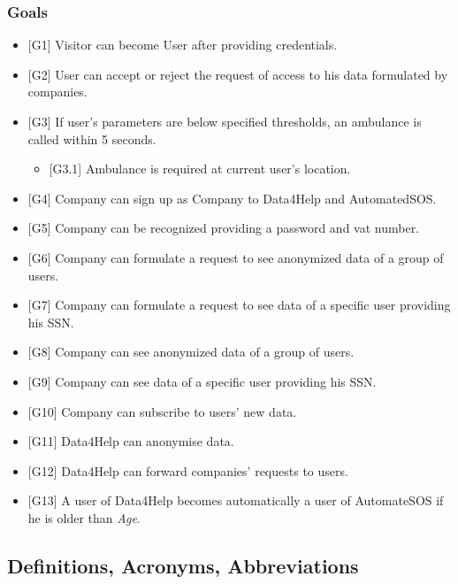 \documentclass{article}
\begin{document}
\subsubsection{Goals}
\begin{itemize}
	\item {[G1]} Visitor can become User after providing credentials.
	\item {[G2]} User can accept or reject the request of access to his data formulated by companies.
	\item {[G3]} If user's parameters are below specified thresholds, an ambulance is called within 5 seconds. 
	\begin{itemize}
		\item {[G3.1]} Ambulance is required at current user's location. 
	\end{itemize}
	\item {[G4]} Company can sign up as Company to Data4Help and AutomatedSOS. 
	\item {[G5]} Company can be recognized providing a password and vat number.
	\item {[G6]} Company can formulate a request to see anonymized data of a group of users.
	\item {[G7]} Company can formulate a request to see data of a specific user providing his SSN.
	\item {[G8]} Company can see anonymized data of a group of users.
	\item {[G9]} Company can see data of a specific user providing his SSN.
	\item {[G10]} Company can subscribe to users' new data.
	\item {[G11]} Data4Help can anonymise data.
	\item {[G12]} Data4Help can forward companies' requests to users. 
	\item {[G13]} A user of Data4Help becomes automatically a user of AutomateSOS if he is older than \emph{Age}.
\end{itemize} 
\subsection{Definitions, Acronyms, Abbreviations}
\end{document}
